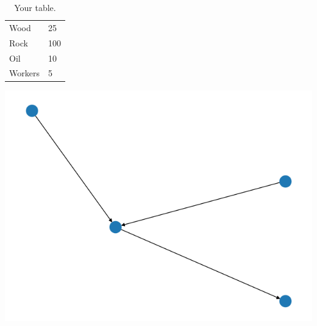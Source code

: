 \documentclass{article}
\begin{document}
\begin{table}
\centering
\begin{tabular}{l | l}
Wood & 25 \\
Rock & 100 \\
Oil & 10 \\
Workers & 5 \\
\end{tabular}
\caption{\label{tab:widgets}Your table.}
\end{table}
\includegraphics{Graph}
\end{document}
